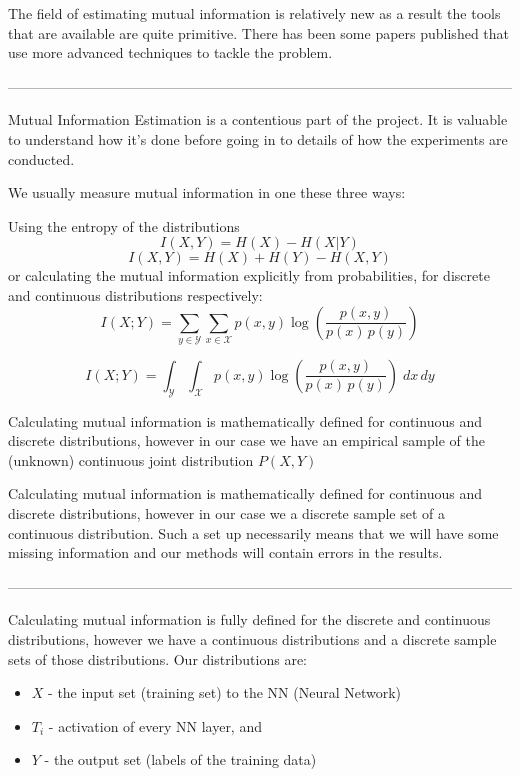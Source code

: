 The field of estimating mutual information is relatively new as a result the
tools that are available are quite primitive. There has been some papers
published that use more advanced techniques to tackle the problem. 

------------------------------------------------------------------------------------------------------------


Mutual Information Estimation is a contentious part of the project. It is
valuable to understand how it's done before going in to details of how the
experiments are conducted.
 
We usually measure mutual information in one these three ways:

Using the entropy of the distributions
\begin{equation}
  I(X, Y) = H(X) - H(X|Y)
\end{equation}
\begin{equation}
  I(X, Y) = H(X) + H(Y) - H(X,Y)
\end{equation}
or calculating the mutual information explicitly from probabilities, for
discrete and continuous distributions respectively:
\begin{equation}
      {I} (X;Y)=\sum _{y\in {\mathcal {Y}}}\sum _{x\in {\mathcal
      {X}}}{p(x,y)\log {\left({\frac {p(x,y)}{p(x)\,p(y)}}\right)}} 
\end{equation}

\begin{equation}
    {I} (X;Y)=\int _{\mathcal {Y}}\int _{\mathcal {X}}{p(x,y)\log {\left({\frac
    {p(x,y)}{p(x)\,p(y)}}\right)}}\;dx\,dy
\end{equation}

Calculating mutual information is mathematically defined for continuous and
discrete distributions, however in our case we have an empirical sample of the
(unknown) continuous joint distribution $P(X, Y)$

Calculating mutual information is mathematically defined for continuous and
discrete distributions, however in our case we a discrete sample set of a
continuous distribution. Such a set up necessarily means that we will have some
missing information and our methods will contain errors in the results.

------------------------------------------------------------------------------------------------------------

Calculating mutual information is fully defined for the discrete and continuous
distributions, however we have a continuous distributions and a discrete sample
sets of those distributions. Our distributions are:
\begin{itemize}
  \item{
      $X$ - the input set (training set) to the NN (Neural Network)
    }
  \item{
      $T_i$ - activation of every NN layer, and
    }
  \item{
      $Y$ - the output set (labels of the training data)
    }
\end{itemize}


